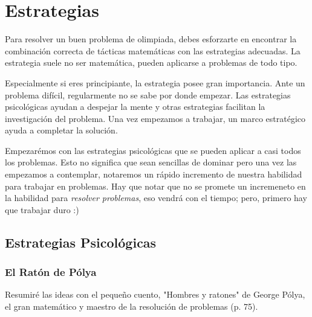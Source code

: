 \chapter{Estrategias}

Para resolver un buen problema de olimpiada, debes esforzarte 
en encontrar la combinación correcta de tácticas matemáticas 
con las estrategias adecuadas. La estrategia suele no ser matemática, 
pueden aplicarse a problemas de todo tipo.

Especialmente si eres principiante, la estrategia posee gran importancia. 
Ante un problema difícil, regularmente no se sabe por donde empezar. 
Las estrategias psicológicas ayudan a despejar la mente y otras 
estrategias facilitan la investigación del problema. 
Una vez empezamos a trabajar, 
un marco estratégico ayuda a completar la solución.

Empezarémos con las estrategias psicológicas que se pueden aplicar a 
casi todos los problemas. Esto no significa que sean sencillas de dominar 
pero una vez las empezamos a contemplar, notaremos un rápido incremento 
de nuestra habilidad para trabajar en problemas. Hay que notar que no 
se promete un incremeneto en la habilidad para \textit{resolver problemas}, 
eso vendrá con el tiempo; pero, primero hay que trabajar duro :)

\section{Estrategias Psicológicas}

\subsection{El Ratón de Pólya}

Resumiré las ideas con el pequeño cuento, "Hombres y ratones" de 
George Pólya, el gran matemático y maestro de la resolución de problemas
(p. 75).

